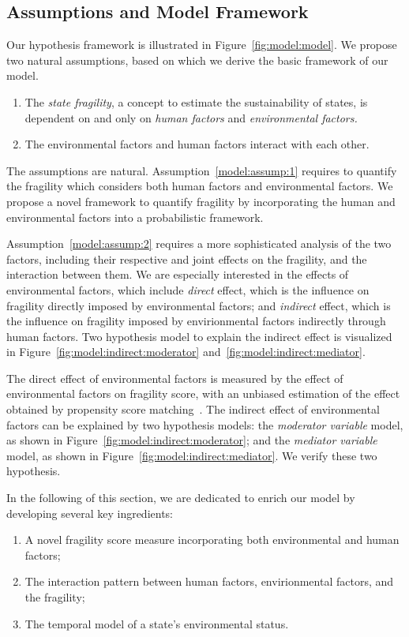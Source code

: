 \subsection{Assumptions and Model Framework}
Our hypothesis framework is illustrated in Figure~\ref{fig:model:model}.
We propose two natural assumptions, based on which we derive the basic framework of our model. 
\begin{enumerate}
   \item The \emph{state fragility}, a concept to estimate the sustainability of states, is dependent on and only on \emph{human factors} and \emph{environmental factors.} \label{model:assump:1}
   \item The environmental factors and human factors interact with each other. \label{model:assump:2}
\end{enumerate}
The assumptions are natural. Assumption~\ref{model:assump:1} requires to quantify the fragility which considers both human factors and environmental factors. We propose a novel framework to quantify fragility by incorporating the human and environmental factors into a probabilistic framework.

Assumption~\ref{model:assump:2} requires a more sophisticated analysis of the two factors, including their respective and joint effects on the fragility, and the interaction between them. We are especially interested in the effects of environmental factors, which include \emph{direct} effect, which is the influence on fragility directly imposed by environmental factors; and \emph{indirect} effect, which is the influence on fragility imposed by envirionmental factors indirectly through human factors. Two hypothesis model to explain the indirect effect is visualized in Figure~\ref{fig:model:indirect:moderator} and~\ref{fig:model:indirect:mediator}.

The direct effect of environmental factors is measured by the effect of environmental factors on fragility score, with an unbiased estimation of the effect obtained by propensity score matching~. The indirect effect of environmental factors can be explained by two hypothesis models: the \emph{moderator variable} model, as shown in Figure~\ref{fig:model:indirect:moderator}; and the \emph{mediator variable} model, as shown in Figure~\ref{fig:model:indirect:mediator}. We verify these two hypothesis.

In the following of this section, we are dedicated to enrich our model by developing several key ingredients: 
\begin{enumerate}
   \item A novel fragility score measure incorporating both environmental and human factors;
   \item The interaction pattern between human factors, envirionmental factors, and the fragility;
   \item The temporal model of a state's environmental status.
\end{enumerate}

